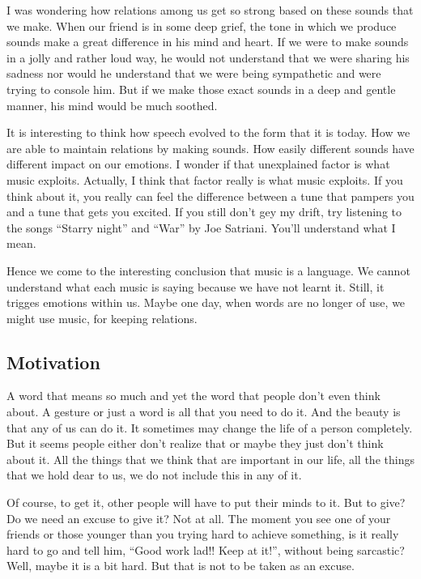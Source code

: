 \documentclass[twoside,11pt,titlepage]{article}
\begin{document}
I was wondering how relations among us get so strong based on these sounds that we make. When our friend is in some deep grief, the tone in which we produce sounds make a great difference in his mind and heart. If we were to make sounds in a jolly and rather loud way, he would not understand that we were sharing his sadness nor would he understand that we were being sympathetic and were trying to console him. But if we make those exact sounds in a deep and gentle manner, his mind would be much soothed.

It is interesting to think how speech evolved to the form that it is today. How we are able to maintain relations by making sounds. How easily different sounds have different impact on our emotions. I wonder if that unexplained factor is what music exploits. Actually, I think that factor really is what music exploits. If you think about it, you really can feel the difference between a tune that pampers you and a tune that gets you excited. If you still don't gey my drift, try listening to the songs ``Starry night'' and ``War'' by Joe Satriani. You'll understand what I mean.

Hence we come to the interesting conclusion that music is a language. We cannot understand what each music is saying because we have not learnt it. Still, it trigges emotions within us. Maybe one day, when words are no longer of use, we might use music, for keeping relations.

\newpage
\begin{center}
  \section{Motivation}
\end{center}
\bigskip
\bigskip
\bigskip

A word that means so much and yet the word that people don't even think about. A gesture or just a word is all that you need to do it. And the beauty is that any of us can do it. It sometimes may change the life of a person completely. But it seems people either don't realize that or maybe they just don't think about it. All the things that we think that are important in our life, all the things that we hold dear to us, we do not include this in any of it.

Of course, to get it, other people will have to put their minds to it. But to give? Do we need an excuse to give it? Not at all. The moment you see one of your friends or those younger than you trying hard to achieve something, is it really hard to go and tell him, ``Good work lad!! Keep at it!'', without being sarcastic? Well, maybe it is a bit hard. But that is not to be taken as an excuse.
\end{document}

